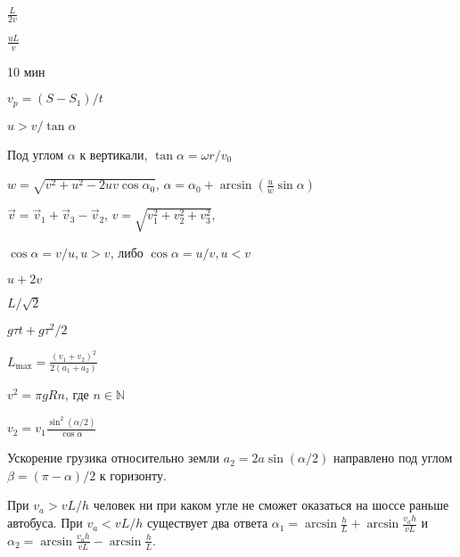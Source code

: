 \begin{Answer}{1}
$\frac{L}{2v}$
\end{Answer}
\begin{Answer}{2}
$\frac{uL}{v}$
\end{Answer}
\begin{Answer}{3}
10 мин
\end{Answer}
\begin{Answer}{4}
$v_p = (S - S_1)/t$
\end{Answer}
\begin{Answer}{5}
$u > v / \tan \alpha$
\end{Answer}
\begin{Answer}{6}
Под углом $\alpha$ к вертикали, $\tan \alpha = \omega r / v_0$
\end{Answer}
\begin{Answer}{7}
$w = \sqrt{v^2 + u^2 - 2uv\cos \alpha_0}$,
$\alpha = \alpha_0 + \arcsin \left( \frac{u}{w} \sin \alpha \right)$
\end{Answer}
\begin{Answer}{8}
$\vec{v} = \vec{v}_1 + \vec{v}_3 - \vec{v}_2$,
$v = \sqrt{v_1^2 + v_2^2 + v_3^2}$,
\end{Answer}
\begin{Answer}{9}
$\cos \alpha = v/u, u > v$, либо $\cos \alpha = u/v, u < v$
\end{Answer}
\begin{Answer}{10}
$u + 2v$
\end{Answer}
\begin{Answer}{11}
$L/\sqrt{2}$
\end{Answer}
\begin{Answer}{12}
$g \tau t + g \tau^2 / 2$
\end{Answer}
\begin{Answer}{13}
$L_{\max} = \frac{(v_1 + v_2)^2}{2(a_1+a_2)}$
\end{Answer}
\begin{Answer}{14}
$v^2 = \pi g R n$, где $n \in \mathbb{N}$
\end{Answer}
\begin{Answer}{15}
$v_2 = v_1 \frac{\sin^2 (\alpha /2)}{\cos \alpha}$
\end{Answer}
\begin{Answer}{16}
Ускорение грузика относительно земли $a_2 = 2a \sin (\alpha /2)$ направлено под углом $\beta  = (\pi - \alpha)/2$ к горизонту.
\end{Answer}
\begin{Answer}{17}
При $v_a > vL/h$ человек ни при каком угле не сможет оказаться на шоссе раньше автобуса. При $v_a < vL/h$ существует два ответа $\alpha_1 = \arcsin \frac{h}{L} + \arcsin \frac{v_ah}{vL}$ и $\alpha_2 =  \arcsin \frac{v_ah}{vL} - \arcsin \frac{h}{L}$.
\end{Answer}
